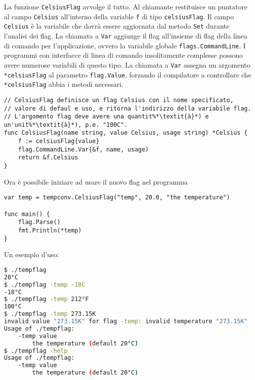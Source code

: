\documentclass[../../thesis.tex]{subfiles}
\begin{document}
    La funzione \verb"CelsiusFlag" avvolge il tutto.
    Al chiamante restituisce un puntatore al campo \verb"Celsius" all'interno della variable \verb"f" di tipo \verb"celsiusFlag".
    Il campo \verb"Celsius" è la variabile che dovrà essere aggiornata dal metodo \verb"Set" durante l'analisi dei flag.
    La chiamata a \verb"Var" aggiunge il flag all'insieme di flag della linea di comando per l'applicazione, ovvero la variabile globale \verb"flags.CommandLine".
    I programmi con interfacce di linea di comando insolitamente complesse possono avere numerose variabili di questo tipo.
    La chiamata a \verb"Var" assegna un argomento \verb"*celsiusFlag" al parametro \verb"flag.Value", forzando il compilatore a controllare che \verb"*celsiusFlag" abbia i metodi necessari.
    \begin{lstlisting}[frame = single, label = {lst:lstlisting6-4.6}]
// CelsiusFlag definisce un flag Celsius con il nome specificato,
// valore di defaul e uso, e ritorna l'indirizzo della variabile flag.
// L'argomento flag deve avere una quantit%*\textit{à}*) e un'unit%*\textit{à}*), p.e. "100C".
func CelsiusFlag(name string, value Celsius, usage string) *Celsius {
    f := celsiusFlag{value}
    flag.CommandLine.Var{&f, name, usage)
    return &f.Celsius
}
    \end{lstlisting}
    Ora è possibile iniziare ad usare il nuovo flag nel programma
    \begin{lstlisting}[frame = single, label = {lst:lstlisting6-4.7}]
var temp = tempconv.CelsiusFlag("temp", 20.0, "the temperature")

func main() {
    flag.Parse()
    fmt.Println(*temp)
}
    \end{lstlisting}
    \clearpage
    \newpage
    Un esempio d'uso:
    \begin{lstlisting}[language = bash, frame = L, label = {lst:lstlisting6-4.8}]
$ ./tempflag
20°C
$ ./tempflag -temp -18C
-18°C
$ ./tempflag -temp 212°F
100°C
$ ./tempflag -temp 273.15K
invalid value "273.15K" for flag -temp: invalid temperature "273.15K"
Usage of ./tempflag:
    -temp value
        the temperature (default 20°C)
$ ./tempflag -help
Usage of ./tempflag:
    -temp value
        the temperature (default 20°C)
    \end{lstlisting}
\end{document}
